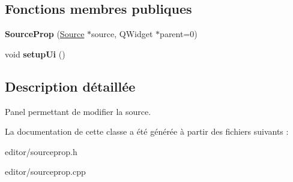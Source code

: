 \subsection*{Fonctions membres publiques}
\begin{DoxyCompactItemize}
\item 
\hypertarget{classSourceProp_ae2499296312b5f80c8dac887fa36008e}{{\bfseries Source\+Prop} (\hyperlink{classSource}{Source} $\ast$source, Q\+Widget $\ast$parent=0)}\label{classSourceProp_ae2499296312b5f80c8dac887fa36008e}

\item 
\hypertarget{classSourceProp_aa77a6eec73ae9dc526fc7cbc8f24138a}{void {\bfseries setup\+Ui} ()}\label{classSourceProp_aa77a6eec73ae9dc526fc7cbc8f24138a}

\end{DoxyCompactItemize}


\subsection{Description détaillée}
Panel permettant de modifier la source. 

La documentation de cette classe a été générée à partir des fichiers suivants \+:\begin{DoxyCompactItemize}
\item 
editor/sourceprop.\+h\item 
editor/sourceprop.\+cpp\end{DoxyCompactItemize}
